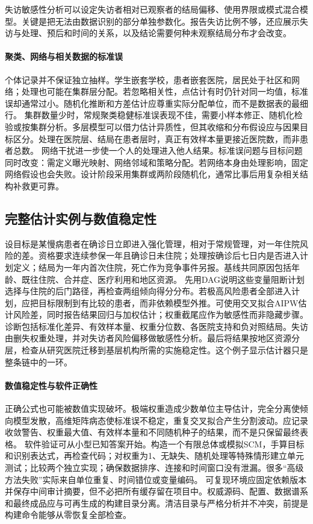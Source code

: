 失访敏感性分析可以设定失访者相对已观察者的结局偏移、使用界限或模式混合模型。关键是把无法由数据识别的部分单独参数化。报告失访比例不够，还应展示失访与处理、预后和时间的关系，以及结论需要何种未观察结局分布才会改变。

\paragraph{聚类、网络与相关数据的标准误}

个体记录并不保证独立抽样。学生嵌套学校，患者嵌套医院，居民处于社区和网络；处理也可能在集群层分配。若忽略相关性，点估计有时仍针对同一均值，标准误却通常过小。随机化推断和方差估计应尊重实际分配单位，而不是数据表的最细行。
集群数量少时，常规聚类稳健标准误表现不佳，需要小样本修正、随机化检验或按集群分析。多层模型可以借力估计异质性，但其收缩和分布假设应与因果目标区分。处理在医院层、结局在患者层时，真正有效样本量更接近医院数，而非患者总数。
网络干扰进一步使一个人的处理进入他人结果。标准误问题与目标问题同时改变：需定义曝光映射、网络邻域和策略分配。若网络本身由处理影响，固定网络假设也会失败。设计阶段采用集群或两阶段随机化，通常比事后用复杂相关结构补救更可靠。

\subsection{完整估计实例与数值稳定性}

设目标是某慢病患者在确诊日立即进入强化管理，相对于常规管理，对一年住院风险的差。资格要求连续参保一年且确诊日未住院；处理按确诊后七日内是否进入计划定义；结局为一年内首次住院，死亡作为竞争事件另报。基线共同原因包括年龄、既往住院、合并症、医疗利用和地区资源。
先用DAG说明这些变量阻断计划选择与住院的后门路径，再检查两组倾向得分分布。若极高风险患者全部进入计划，应把目标限制到有比较的患者，而非依赖模型外推。可使用交叉拟合AIPW估计风险差，同时报告结果回归与加权估计；权重截尾应作为敏感性而非隐藏步骤。
诊断包括标准化差异、有效样本量、权重分位数、各医院支持和负对照结局。失访由删失权重处理，并对失访者风险偏移做敏感性分析。最后将结果按地区资源分层，检查从研究医院迁移到基层机构所需的实施稳定性。这个例子显示估计器只是整条链中的一环。

\paragraph{数值稳定性与软件正确性}

正确公式也可能被数值实现破坏。极端权重造成少数单位主导估计，完全分离使倾向模型发散，高维矩阵病态使标准误不稳定，重复交叉拟合产生分割波动。应记录收敛警告、权重最大值、有效样本量和不同随机种子的结果，而不是只保留最终表格。
软件验证可从小型已知答案开始。构造一个有限总体或模拟SCM，手算目标和识别表达式，再检查代码；对权重为1、无缺失、随机处理等特殊情形建立单元测试；比较两个独立实现；确保数据排序、连接和时间窗口没有泄漏。很多“高级方法失败”实际来自单位重复、时间错位或变量编码。
可复现环境应固定依赖版本并保存中间审计摘要，但不必把所有缓存留在项目中。权威源码、配置、数据谱系和最终成品应与可再生成的构建目录分离。清洁目录与严格分析并不冲突，前提是构建命令能够从零恢复全部检查。

